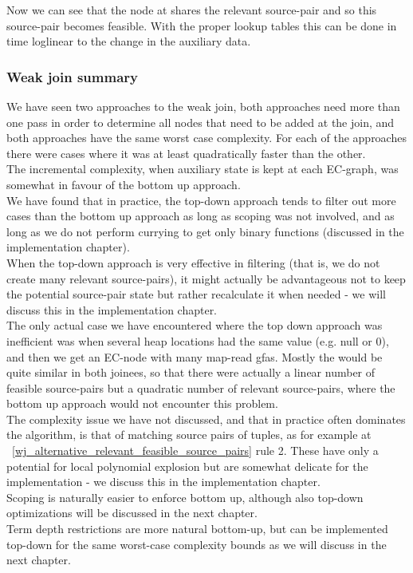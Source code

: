 Now we can see that the node  at  shares the relevant source-pair \m{[b,c]} and so this source-pair becomes feasible.
With the proper lookup tables this can be done in time loglinear to the change in the auxiliary data.


\subsubsection*{Weak join summary}
We have seen two approaches to the weak join, both approaches need more than one pass in order to determine all nodes that need to be added at the join, and both approaches have the same worst case complexity. For each of the approaches there were cases where it was at least quadratically faster than the other.\\
The incremental complexity, when auxiliary state is kept at each EC-graph, was somewhat in favour of the bottom up approach.\\
We have found that in practice, the top-down approach tends to filter out more cases than the bottom up approach as long as scoping was not involved, and as long as we do not perform currying to get only binary functions (discussed in the implementation chapter). \\
When the top-down approach is very effective in filtering (that is, we do not create many relevant source-pairs), 
it might actually be advantageous not to keep the potential source-pair state but rather recalculate it when needed - we will discuss this in the implementation chapter.\\
The only actual case we have encountered where the top down approach was inefficient was when several heap locations had the same value (e.g. null or 0), 
and then we get an EC-node with many map-read gfas. Mostly the \GFAs{} would be quite similar in both joinees, 
so that there were actually a linear number of feasible source-pairs but a quadratic number of relevant source-pairs, where the bottom up approach would not encounter this problem.\\
The complexity issue we have not discussed, and that in practice often dominates the algorithm, is that of matching source pairs of tuples, as for example at ~\ref{wj_alternative_relevant_feasible_source_pairs} rule 2. These have only a potential for local polynomial explosion but are somewhat delicate for the implementation - we discuss this in the implementation chapter.\\
Scoping is naturally easier to enforce bottom up, although also top-down optimizations will be discussed in the next chapter.\\
Term  depth restrictions are more natural bottom-up, but can be implemented top-down for the same worst-case complexity bounds as we will discuss in the next chapter.

